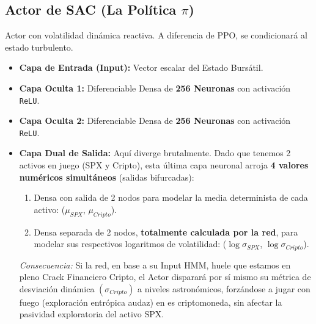 \documentclass[11pt,a4paper]{article}
\begin{document}
\subsection{Actor de SAC (La Política $\pi$)}
Actor con volatilidad dinámica reactiva. A diferencia de PPO, se condicionará al estado turbulento.
\begin{itemize}
    \item \textbf{Capa de Entrada (Input):} Vector escalar del Estado Bursátil.
    \item \textbf{Capa Oculta 1:} Diferenciable Densa de \textbf{256 Neuronas} con activación \texttt{ReLU}.
    \item \textbf{Capa Oculta 2:} Diferenciable Densa de \textbf{256 Neuronas} con activación \texttt{ReLU}.
    \item \textbf{Capa Dual de Salida:} Aquí diverge brutalmente. Dado que tenemos 2 activos en juego (SPX y Cripto), esta última capa neuronal arroja \textbf{4 valores numéricos simultáneos} (salidas bifurcadas):
    \begin{enumerate}
        \item Densa con salida de 2 nodos para modelar la media determinista de cada activo: ($\mu_{SPX}$, $\mu_{Cripto}$).
        \item Densa separada de 2 nodos, \textbf{totalmente calculada por la red}, para modelar sus respectivos logaritmos de volatilidad: ($\log \sigma_{SPX}$, $\log \sigma_{Cripto}$).
    \end{enumerate}
    \textit{Consecuencia:} Si la red, en base a su Input HMM, huele que estamos en pleno Crack Financiero Cripto, el Actor disparará por sí mismo su métrica de desviación dinámica $(\sigma_{Cripto})$ a niveles astronómicos, forzándose a jugar con fuego (exploración entrópica audaz) en es criptomoneda, sin afectar la pasividad exploratoria del activo SPX.
\end{itemize}
\end{document}
